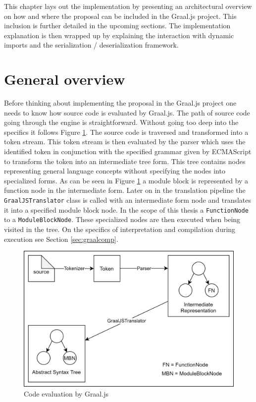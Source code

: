 This chapter lays out the implementation by presenting an architectural overview on how and where the proposal can be included in the Graal.js project. This inclusion is further detailed in the upcoming sections. The implementation explanation is then wrapped up by explaining the interaction with dynamic imports and the serialization / deserialization framework.

\section{General overview}
Before thinking about implementing the proposal in the Graal.js project one needs to know how source code is evaluated by Graal.js. The path of source code going through the engine is straightforward. Without going too deep into the specifics it follows Figure \ref{fig:mainImpl}. The source code is traversed and transformed into a token stream. This token stream is then evaluated by the parser which uses the identified token in conjunction with the specified grammar given by ECMAScript \cite{ecma} to transform the token into an intermediate tree form. This tree contains nodes representing general language concepts without specifying the nodes into specialized forms. As can be seen in Figure \ref{fig:mainImpl} a module block is represented by a function node in the intermediate form. Later on in the translation pipeline the \texttt{GraalJSTranslator} class is called with an intermediate form node and translates it into a specified module block node. In the scope of this thesis a \texttt{FunctionNode} to a \texttt{ModuleBlockNode}. These specialized nodes are then executed when being visited in the tree. On the specifics of interpretation and compilation during execution see Section \ref{sec:graalcomp}. 

\begin{figure}[h!]
    \centering
    \includegraphics[scale=0.165]{figures/implMain.png}
    \caption{Code evaluation by Graal.js}
    \label{fig:mainImpl}
\end{figure}

